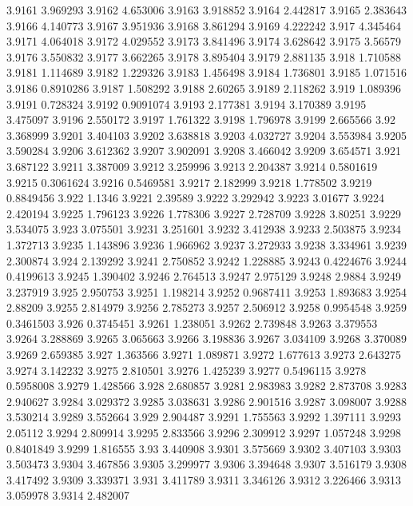 3.9161  3.969293
3.9162  4.653006
3.9163  3.918852
3.9164  2.442817
3.9165  2.383643
3.9166  4.140773
3.9167  3.951936
3.9168  3.861294
3.9169  4.222242
3.917  4.345464
3.9171  4.064018
3.9172  4.029552
3.9173  3.841496
3.9174  3.628642
3.9175  3.56579
3.9176  3.550832
3.9177  3.662265
3.9178  3.895404
3.9179  2.881135
3.918  1.710588
3.9181  1.114689
3.9182  1.229326
3.9183  1.456498
3.9184  1.736801
3.9185  1.071516
3.9186  0.8910286
3.9187  1.508292
3.9188  2.60265
3.9189  2.118262
3.919  1.089396
3.9191  0.728324
3.9192  0.9091074
3.9193  2.177381
3.9194  3.170389
3.9195  3.475097
3.9196  2.550172
3.9197  1.761322
3.9198  1.796978
3.9199  2.665566
3.92  3.368999
3.9201  3.404103
3.9202  3.638818
3.9203  4.032727
3.9204  3.553984
3.9205  3.590284
3.9206  3.612362
3.9207  3.902091
3.9208  3.466042
3.9209  3.654571
3.921  3.687122
3.9211  3.387009
3.9212  3.259996
3.9213  2.204387
3.9214  0.5801619
3.9215  0.3061624
3.9216  0.5469581
3.9217  2.182999
3.9218  1.778502
3.9219  0.8849456
3.922  1.1346
3.9221  2.39589
3.9222  3.292942
3.9223  3.01677
3.9224  2.420194
3.9225  1.796123
3.9226  1.778306
3.9227  2.728709
3.9228  3.80251
3.9229  3.534075
3.923  3.075501
3.9231  3.251601
3.9232  3.412938
3.9233  2.503875
3.9234  1.372713
3.9235  1.143896
3.9236  1.966962
3.9237  3.272933
3.9238  3.334961
3.9239  2.300874
3.924  2.139292
3.9241  2.750852
3.9242  1.228885
3.9243  0.4224676
3.9244  0.4199613
3.9245  1.390402
3.9246  2.764513
3.9247  2.975129
3.9248  2.9884
3.9249  3.237919
3.925  2.950753
3.9251  1.198214
3.9252  0.9687411
3.9253  1.893683
3.9254  2.88209
3.9255  2.814979
3.9256  2.785273
3.9257  2.506912
3.9258  0.9954548
3.9259  0.3461503
3.926  0.3745451
3.9261  1.238051
3.9262  2.739848
3.9263  3.379553
3.9264  3.288869
3.9265  3.065663
3.9266  3.198836
3.9267  3.034109
3.9268  3.370089
3.9269  2.659385
3.927  1.363566
3.9271  1.089871
3.9272  1.677613
3.9273  2.643275
3.9274  3.142232
3.9275  2.810501
3.9276  1.425239
3.9277  0.5496115
3.9278  0.5958008
3.9279  1.428566
3.928  2.680857
3.9281  2.983983
3.9282  2.873708
3.9283  2.940627
3.9284  3.029372
3.9285  3.038631
3.9286  2.901516
3.9287  3.098007
3.9288  3.530214
3.9289  3.552664
3.929  2.904487
3.9291  1.755563
3.9292  1.397111
3.9293  2.05112
3.9294  2.809914
3.9295  2.833566
3.9296  2.309912
3.9297  1.057248
3.9298  0.8401849
3.9299  1.816555
3.93  3.440908
3.9301  3.575669
3.9302  3.407103
3.9303  3.503473
3.9304  3.467856
3.9305  3.299977
3.9306  3.394648
3.9307  3.516179
3.9308  3.417492
3.9309  3.339371
3.931  3.411789
3.9311  3.346126
3.9312  3.226466
3.9313  3.059978
3.9314  2.482007
